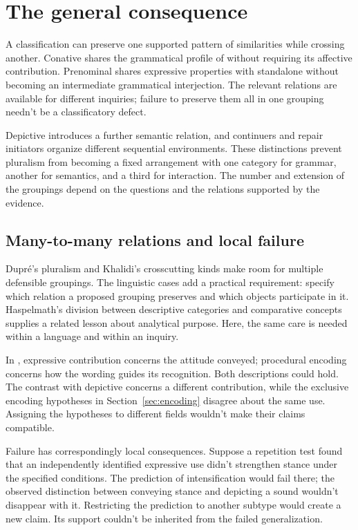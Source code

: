 \documentclass[12pt]{article}
\begin{document}
\section{The general consequence}\label{sec:discussion}

A classification can preserve one supported pattern of similarities
while crossing another. Conative  shares the grammatical profile
of  without requiring its affective contribution. Prenominal
 shares expressive properties with standalone 
without becoming an intermediate grammatical interjection. The relevant
relations are available for different inquiries; failure to preserve
them all in one grouping needn't be a classificatory defect.

Depictive  introduces a further semantic relation, and continuers
and repair initiators organize different sequential environments. These
distinctions prevent pluralism from becoming a fixed arrangement with
one category for grammar, another for semantics, and a third for interaction.
The number and extension of the groupings depend on the questions
and the relations supported by the evidence.

\subsection{Many-to-many relations and local failure}

Dupr\'e's pluralism and Khalidi's crosscutting kinds make room for
multiple defensible groupings. The linguistic cases add a practical
requirement: specify which relation a proposed grouping preserves and
which objects participate in it. Haspelmath's division between descriptive
categories and comparative concepts supplies a related lesson about
analytical purpose. Here, the same care is needed within a language
and within an inquiry.

In , expressive contribution concerns
the attitude conveyed; procedural encoding concerns how the wording
guides its recognition. Both descriptions could hold. The contrast with
depictive  concerns a different contribution, while the
exclusive encoding hypotheses in Section~\ref{sec:encoding} disagree about
the same use. Assigning the hypotheses to different fields wouldn't
make their claims compatible.

Failure has correspondingly local consequences. Suppose a repetition
test found that an independently identified expressive use didn't
strengthen stance under the specified conditions. The prediction of
intensification would fail there; the observed distinction between
conveying stance and depicting a sound wouldn't disappear with it.
Restricting the prediction to another subtype would create a new
claim. Its support couldn't be inherited from the failed generalization.
\end{document}
